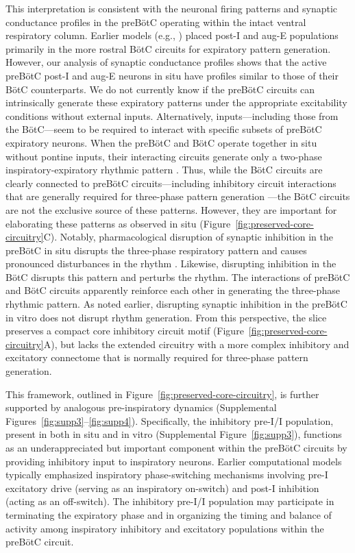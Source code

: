 \documentclass[
]{article}
\newcommand{\figref}[1]{Figure~\ref{#1}}
\newcommand{\figpanelref}[2]{Figure~\ref{#1}#2}
\newcommand{\suppfigref}[1]{Supplemental Figure~\ref{#1}}
\newcommand{\suppfigrange}[2]{Supplemental Figures~\ref{#1}--\ref{#2}}
\begin{document}
This interpretation is consistent with the neuronal firing patterns and synaptic conductance profiles in the preBötC operating within the intact ventral respiratory column. Earlier models (e.g., \citep{smith2007spatial}) placed post-I and aug-E populations primarily in the more rostral BötC circuits for expiratory pattern generation. However, our analysis of synaptic conductance profiles shows that the active preBötC post-I and aug-E neurons in situ have profiles similar to those of their BötC counterparts. We do not currently know if the preBötC circuits can intrinsically generate these expiratory patterns under the appropriate excitability conditions without external inputs. Alternatively, inputs---including those from the BötC---seem to be required to interact with specific subsets of preBötC expiratory neurons. When the preBötC and BötC operate together in situ without pontine inputs, their interacting circuits generate only a two-phase inspiratory-expiratory rhythmic pattern \citep{smith2007spatial}. Thus, while the BötC circuits are clearly connected to preBötC circuits---including inhibitory circuit interactions \citep{ausborn2018organization} that are generally required for three-phase pattern generation \citep{richter2014respiratory,marchenko2016perturbations}---the BötC circuits are not the exclusive source of these patterns. However, they are important for elaborating these patterns as observed in situ (\figpanelref{fig:preserved-core-circuitry}{C}). Notably, pharmacological disruption of synaptic inhibition in the preBötC in situ disrupts the three-phase respiratory pattern and causes pronounced disturbances in the rhythm \citep{marchenko2016perturbations}. Likewise, disrupting inhibition in the BötC disrupts this pattern and perturbs the rhythm. The interactions of preBötC and BötC circuits apparently reinforce each other in generating the three-phase rhythmic pattern. As noted earlier, disrupting synaptic inhibition in the preBötC in vitro does not disrupt rhythm generation. From this perspective, the slice preserves a compact core inhibitory circuit motif (\figpanelref{fig:preserved-core-circuitry}{A}), but lacks the extended circuitry with a more complex inhibitory and excitatory connectome that is normally required for three-phase pattern generation.

This framework, outlined in \figref{fig:preserved-core-circuitry}, is further supported by analogous pre-inspiratory dynamics (\suppfigrange{fig:supp3}{fig:supp4}). Specifically, the inhibitory pre-I/I population, present in both in situ and in vitro (\suppfigref{fig:supp3}), functions as an underappreciated but important component within the preBötC circuits by providing inhibitory input to inspiratory neurons. Earlier computational models \citep{smith2007spatial,ausborn2018organization,butera1999coupled} typically emphasized inspiratory phase-switching mechanisms involving pre-I excitatory drive (serving as an inspiratory on-switch) and post-I inhibition (acting as an off-switch). The inhibitory pre-I/I population may participate in terminating the expiratory phase and in organizing the timing and balance of activity among inspiratory inhibitory and excitatory populations within the preBötC circuit.
\end{document}
